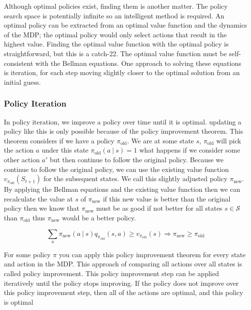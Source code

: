 \documentclass[]{final_report}
\begin{document}
Although optimal policies exist, finding them is another matter. The policy search space is potentially infinite so an intelligent method is required. An optimal policy can be extracted from an optimal value function and the dynamics of the MDP; the optimal policy would only select actions that result in the highest value. Finding the optimal value function with the optimal policy is straightforward, but this is a catch-22. The optimal value function must be self-consistent with the Bellman equations. One approach to solving these equations is iteration, for each step moving slightly closer to the optimal solution from an initial guess. 

\subsubsection{Policy Iteration}

In policy iteration, we improve a policy over time until it is optimal. updating a policy like this is only possible because of the policy improvement theorem. This theorem considers if we have a policy $\pi_{\text{old}}$. We are at some state $s$, $\pi_{\text{old}}$ will pick the action $a$ under this state $\pi_{\text{old}}(a\ |\ s) = 1$ what happens if we consider some other action $a'$ but then continue to follow the original policy. Because we continue to follow the original policy, we can use the existing value function $v_{\pi_{\text{old}}}(S_{t+1})$ for the subsequent states. We call this slightly adjusted policy $\pi_{\text{new}}$. By applying the Bellman equations and the existing value function then we can recalculate the value at $s$ of $\pi_{\text{new}}$ if this new value is better than the original policy then we know that $\pi_{\text{new}}$ must be as good if not better for all states $s \in \mathcal{S}$ than $\pi_{\text{old}}$ thus $\pi_{\text{new}}$ would be a better policy. 


\begin{equation}
  \sum_a \pi_{\text{new}}(a\ |\ s) q_{\pi_{\text{old}}}(s,a) \ge v_{\pi_{\text{old}}}(s) \Rightarrow  \pi_{\text{new}} \ge \pi_{\text{old}}
  \label{eqn:policy-improvement-theorem}
\end{equation}

For some policy $\pi$ you can apply this policy improvement theorem for every state and action in the MDP. This approach of comparing all actions over all states is called policy improvement. This policy improvement step can be applied iteratively until the policy stops improving. If the policy does not improve over this policy improvement step, then all of the actions are optimal, and this policy is optimal
\end{document}
